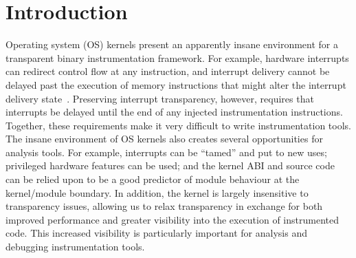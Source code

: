 \documentclass[preprint]{sigplanconf}
\begin{document}
\section{Introduction}\label{sec:intro}


Operating system (OS) kernels present an apparently insane environment for a transparent binary instrumentation framework.  For example, hardware interrupts can redirect control flow at any instruction, and interrupt delivery cannot be delayed past the execution of memory instructions that might alter the interrupt delivery state~\cite{DRK}. Preserving interrupt transparency, however, requires that interrupts be delayed until the end of any injected instrumentation instructions.  Together, these requirements make it very difficult to write instrumentation tools.  The insane environment of OS kernels also creates several opportunities for analysis tools. For example, interrupts can be ``tamed'' and put to new uses; privileged hardware features can be used; and the kernel ABI and source code can be relied upon to be a good predictor of module behaviour at the kernel/module boundary. In addition, the kernel is largely insensitive to transparency issues, allowing us to relax transparency in exchange for both improved performance and greater visibility into the execution of instrumented code.  This increased visibility is particularly important for analysis and debugging instrumentation tools.
\end{document}
